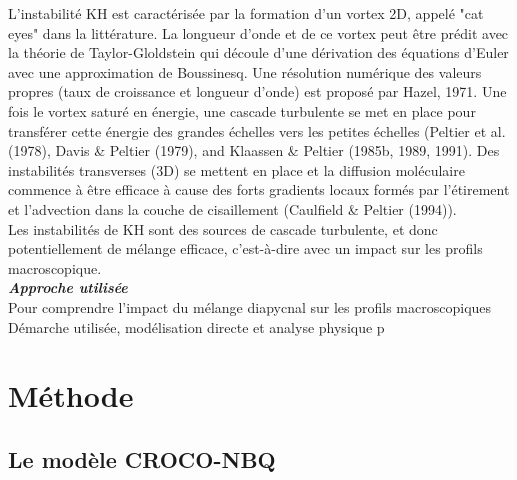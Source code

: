 \documentclass[a4paper,12pt]{article}
\begin{document}
    L'instabilité KH est caractérisée par la formation d'un vortex 2D, appelé "cat eyes" dans la littérature. La longueur d'onde et de ce vortex peut être prédit avec la théorie de Taylor-Gloldstein qui découle d'une dérivation des équations d'Euler avec une approximation de Boussinesq. Une résolution numérique des valeurs propres (taux de croissance et longueur d'onde) est proposé par Hazel, 1971. Une fois le vortex saturé en énergie, une cascade turbulente se met en place pour transférer cette énergie des grandes échelles vers les petites échelles (Peltier et al. (1978), Davis \& Peltier (1979), and Klaassen \& Peltier (1985b, 1989, 1991). Des instabilités transverses (3D) se mettent en place et la diffusion moléculaire commence à être efficace à cause des forts gradients locaux formés par l'étirement et l'advection dans la couche de cisaillement (Caulfield \& Peltier (1994)).  \\
    Les instabilités de KH sont des sources de cascade turbulente, et donc potentiellement de mélange efficace, c'est-à-dire avec un impact sur les profils macroscopique.
    \\
    \newline
    \textbf{\textit{Approche utilisée}} \\
    Pour comprendre l'impact du mélange diapycnal sur les profils macroscopiques
    Démarche utilisée, modélisation directe et analyse physique
    p

\newpage
\section{Méthode}

    \subsection{Le modèle CROCO-NBQ}
    
\end{document}
